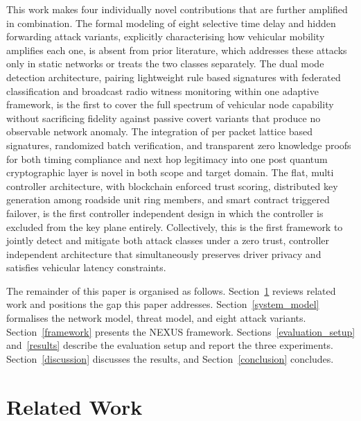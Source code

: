 \documentclass[lettersize,journal]{IEEEtran}
\theoremstyle{plain}
\theoremstyle{remark}
\begin{document}
	This work makes four individually novel contributions that are further
	amplified in combination. The formal modeling of eight selective time
	delay and hidden forwarding attack variants, explicitly characterising
	how vehicular mobility amplifies each one, is absent from prior
	literature, which addresses these attacks only in static networks or
	treats the two classes separately. The dual mode detection architecture,
	pairing lightweight rule based signatures with federated classification
	and broadcast radio witness monitoring within one adaptive framework,
	is the first to cover the full spectrum of vehicular node capability
	without sacrificing fidelity against passive covert variants that
	produce no observable network anomaly. The integration of per packet
	lattice based signatures, randomized batch verification, and
	transparent zero knowledge proofs for both timing compliance and next
	hop legitimacy into one post quantum cryptographic layer is novel in
	both scope and target domain. The flat, multi controller architecture,
	with blockchain enforced trust scoring, distributed key generation
	among roadside unit ring members, and smart contract triggered
	failover, is the first controller independent design in which the
	controller is excluded from the key plane entirely. Collectively, this
	is the first framework to jointly detect and mitigate both attack
	classes under a zero trust, controller independent architecture that
	simultaneously preserves driver privacy and satisfies vehicular latency
	constraints.
	
	The remainder of this paper is organised as follows. Section~\ref{related}
	reviews related work and positions the gap this paper addresses.
	Section~\ref{system_model} formalises the network model, threat model,
	and eight attack variants. Section~\ref{framework} presents the NEXUS
	framework. Sections~\ref{evaluation_setup} and~\ref{results} describe
	the evaluation setup and report the three experiments. Section~\ref{discussion}
	discusses the results, and Section~\ref{conclusion} concludes.
	
	
	\section{Related Work}\label{related}
	
\end{document}
